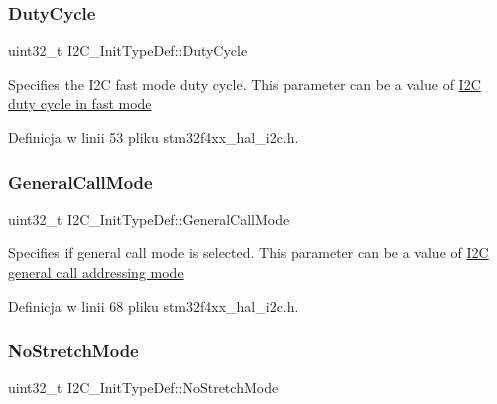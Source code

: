 \mbox{\label{struct_i2_c___init_type_def_a91eb2f998ac771478ec0f44ac73c32dd}} 
\subsubsection{\texorpdfstring{Duty\+Cycle}{DutyCycle}}
{\footnotesize\ttfamily uint32\+\_\+t I2\+C\+\_\+\+Init\+Type\+Def\+::\+Duty\+Cycle}

Specifies the I2C fast mode duty cycle. This parameter can be a value of \hyperlink{group___i2_c__duty__cycle__in__fast__mode}{I2C duty cycle in fast mode} 

Definicja w linii 53 pliku stm32f4xx\+\_\+hal\+\_\+i2c.\+h.

\mbox{\label{struct_i2_c___init_type_def_a17ce92b135a4b5c045a5387c91677803}} 
\subsubsection{\texorpdfstring{General\+Call\+Mode}{GeneralCallMode}}
{\footnotesize\ttfamily uint32\+\_\+t I2\+C\+\_\+\+Init\+Type\+Def\+::\+General\+Call\+Mode}

Specifies if general call mode is selected. This parameter can be a value of \hyperlink{group___i2_c__general__call__addressing__mode}{I2C general call addressing mode} 

Definicja w linii 68 pliku stm32f4xx\+\_\+hal\+\_\+i2c.\+h.

\mbox{\label{struct_i2_c___init_type_def_a28afdce458703464638f1a01e04da04e}} 
\subsubsection{\texorpdfstring{No\+Stretch\+Mode}{NoStretchMode}}
{\footnotesize\ttfamily uint32\+\_\+t I2\+C\+\_\+\+Init\+Type\+Def\+::\+No\+Stretch\+Mode}

